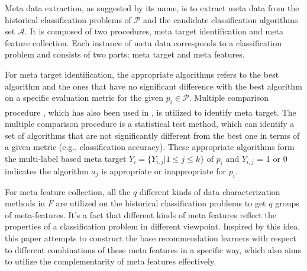 \documentclass[review,3p,twocolumn,times]{elsarticle}
\newcommand{\upcite}[1]{\textsuperscript{\cite{#1}}}
\begin{document}
Meta data extraction, as suggested by its name, is to extract meta data from the historical classification problems of $\mathcal{P}$ and the candidate classification algorithms set $\mathcal{A}$. It is composed of two procedures, meta target identification and meta feature collection. Each instance of meta data corresponds to a classification problem and consists of two parts: meta target and meta features.

For meta target identification, the appropriate algorithms refers to the best algorithm and the ones that have no significant difference with the best algorithm on a specific evaluation metric for the given $p_i \in \mathcal{P}$. Multiple comparison procedure \upcite{Toothaker1993Multiple,Demsar2006Statistical}, which has also been used in \cite{Wang2014A, Zhu2018A}, is utilized to identify meta target. The multiple comparison procedure is a statistical test method, which can identify a set of algorithms that are not significantly different from the best one in terms of a given metric (e.g., classification accuracy). These appropriate algorithms form the multi-label based meta target $Y_i = \{Y_{i,j} |1 \leq j \leq k \}$ of $p_i$ and $Y_{i,j}$ = 1 or 0 indicates the algorithm $a_j$ is appropriate or inappropriate for $p_i$.

For meta feature collection, all the $q$ different kinds of data characterization methods in $F$ are utilized on the historical classification problems to get $q$ groups of meta-features. It's a fact that different kinds of meta features reflect the properties of a classification problem in different viewpoint. Inspired by this idea, this paper attempts to construct the base recommendation learners with respect to different combinations of these meta features in a specific way, which also aims to utilize the complementarity of meta features effectively. 
\end{document}
